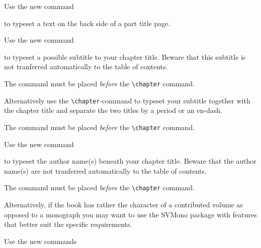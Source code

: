 \documentclass[graybox,square]{svmono}
\begin{document}
\begin{sloppy}
Use the new command

\cprotect{}

to typeset a text on the back side of a part title page.

Use the new command

\cprotect{}

to typeset a possible subtitle to your chapter title. Beware that this subtitle is not tranferred automatically to the table of contents.

The command must be placed {\it before} the \verb|\chapter| command.

Alternatively use the \verb|\chapter|-command to typeset your subtitle together with the chapter title and separate the two titles by a period or an en-dash. 

The command must be placed {\it before} the \verb|\chapter| command.

\eject

Use the new command

\cprotect{}

to typeset the author name(s) beneath your chapter title. Beware that the author name(s) are not tranferred automatically to the table of contents.

The command must be placed {\it before} the \verb|\chapter| command.

Alternatively, if the book has rather the character of a contributed volume as opposed to a monograph you may want to use the {\sc SVMono} package with features that better suit the specific requirements.  

Use the new commands

\cprotect{}


\end{sloppy}
\end{document}
